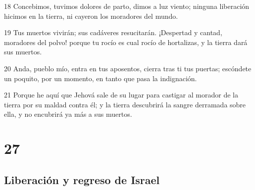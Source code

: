 \par 18 Concebimos, tuvimos dolores de parto, dimos a luz viento; ninguna liberación hicimos en la tierra, ni cayeron los moradores del mundo.
\par 19 Tus muertos vivirán; sus cadáveres resucitarán. ¡Despertad y cantad, moradores del polvo! porque tu rocío es cual rocío de hortalizas, y la tierra dará sus muertos.
\par 20 Anda, pueblo mío, entra en tus aposentos, cierra tras ti tus puertas; escóndete un poquito, por un momento, en tanto que pasa la indignación.
\par 21 Porque he aquí que Jehová sale de su lugar para castigar al morador de la tierra por su maldad contra él; y la tierra descubrirá la sangre derramada sobre ella, y no encubrirá ya más a sus muertos.

\chapter{27}

\section*{Liberación y regreso de Israel}

